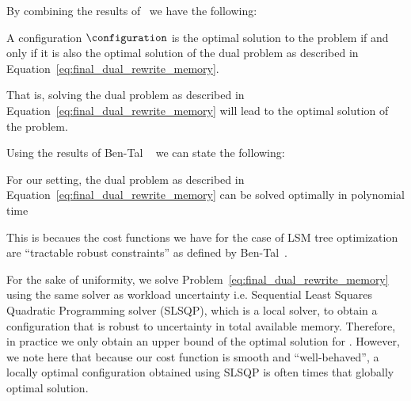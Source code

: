 By combining the results of~\cite{} we have the following:

\begin{lemma}
A configuration $\configuration$ is the optimal solution to the
{\robustm} problem if and only if it is also the optimal solution of the dual problem as described in Equation~\eqref{eq:final_dual_rewrite_memory}.
\end{lemma}
That is, solving the dual problem as described in Equation~\eqref{eq:final_dual_rewrite_memory} will lead to the optimal solution
of the {\robustm} problem.

Using the results of 
Ben-Tal {\etal}~\cite{Ben-Tal1998-ic} we can state the following:

\begin{lemma} For our setting, the dual problem as described in Equation~\eqref{eq:final_dual_rewrite_memory} can be solved
 optimally in polynomial time 
 \end{lemma}
This is becaues the cost functions we have for the case of LSM tree optimization are ``tractable robust constraints''
as defined by Ben-Tal~\cite{Ben-Tal1998-ic}.


For the sake of uniformity, we solve
Problem~\eqref{eq:final_dual_rewrite_memory} using the same solver as workload 
uncertainty i.e. Sequential Least Squares Quadratic Programming solver (SLSQP),
which is a local solver, to obtain a configuration {\configuration} that is
robust to uncertainty in total available memory.  Therefore, in practice we only obtain an upper bound of the optimal
solution for {\robustm}. However, we note here that 
because our cost function is smooth and ``well-behaved'', a
locally optimal configuration obtained using SLSQP is often times that globally optimal
solution.



